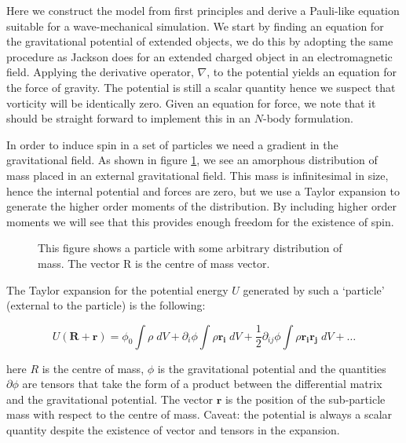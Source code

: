 Here we construct the model from first principles and derive a Pauli-like equation suitable for a wave-mechanical simulation. We start by finding an equation for the gravitational potential of extended objects, we do this by adopting the same procedure as Jackson \citep{bib_jack} does for an extended charged object in an electromagnetic field. Applying the derivative operator, $\nabla$, to the potential yields an equation for the force of gravity. The potential is still a scalar quantity hence we suspect that vorticity will be identically zero. Given an equation for force, we note that it should be straight forward to implement this in an $N$-body formulation.

In order to induce spin in a set of particles we need a gradient in the gravitational field. As shown in figure \ref{fig.jackson}, we see an amorphous distribution of mass placed in an external gravitational field. This mass is infinitesimal in size, hence the internal potential and forces are zero, but we use a Taylor expansion to generate the higher order moments of the distribution. By including higher order moments we will see that this provides enough freedom for the existence of spin.

\begin{figure}[htb]
   \begin{center}
     \leavevmode
                \epsfxsize=80mm

   \end{center}
\caption{This figure shows a particle with some arbitrary distribution of mass. The vector R is the centre of mass vector.}
\label{fig.jackson}
\end{figure} 

\noindent The Taylor expansion for the potential energy $U$ generated by such a `particle' (external to the particle) is the following:

\begin{equation}
\label{taylor}
U (\mathbf{R} + \mathbf{r}) = \phi_0 \int \rho\;dV + \partial_i \phi \int \rho \mathbf{r_i}\;dV + \frac{1}{2}\partial_{ij} \phi \int \rho \mathbf{r_i} \mathbf{r_j}\;dV + \ldots
\end{equation}

\noindent here $R$ is the centre of mass, $\phi$ is the gravitational potential and the quantities $\partial \phi$ are tensors that take the form of a product between the differential matrix and the gravitational potential. The vector $\mathbf{r}$ is the position of the sub-particle mass with respect to the centre of mass. Caveat: the potential is always a scalar quantity despite the existence of vector and tensors in the expansion.

